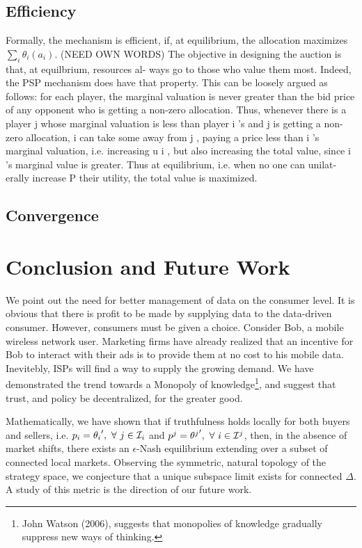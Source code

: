 \subsection{Efficiency}

Formally, the
mechanism is efficient, if, at equilibrium, the allocation maximizes
$\sum_i\theta_i(a_i)$.
(NEED OWN WORDS)
The objective in designing the auction is that, at equilbrium, resources al-
ways go to those who value them most. Indeed, the PSP mechanism does
have that property. This can be loosely argued as follows: for each player,
the marginal valuation is never greater than the bid price of any opponent
who is getting a non-zero allocation. Thus, whenever there is a player j
whose marginal valuation is less than player i 's and j is getting a non-zero
allocation, i can take some away from j , paying a price less than i 's marginal
valuation, i.e. increasing u i , but also increasing the total value, since i 's
marginal value is greater. Thus at equilibrium, i.e. when no one can unilat-
erally increase P their utility, the total value is maximized.

\subsection{Convergence}

\section{Conclusion and Future Work}

We point out the need for better management of data on the consumer
level. It is obvious that there is profit to be made by
supplying data to the data-driven consumer. However, consumers must be given a
choice. Consider Bob, a mobile wireless network user. Marketing firms have already realized that an incentive
for Bob to interact with their ads is to provide them at no cost to his mobile
    data. Inevitebly, ISPs will find a way to supply the growing demand. We
    have demonstrated the trend towards a Monopoly of knowledge\footnote{John
    Watson (2006), suggests that monopolies of knowledge gradually suppress new ways
    of thinking.}, and suggest
    that trust, and policy be decentralized, for the greater good.

Mathematically, we have shown that if truthfulness holds locally for both buyers and sellers, i.e.
$p_i ={\theta_i}', \ \forall \ j \in \mathcal{I}_i$ and $p^j = {\theta^j}', \ \forall \
i \in\mathcal{I}^j$, then, in the absence of market shifts,
there exists an $\epsilon$-Nash equilibrium extending over a subset of connected
local markets. Observing the symmetric, natural topology of the strategy space,
we conjecture that a unique subspace limit exists for connected $\Delta$. A
study of this metric is the direction of our future work.

